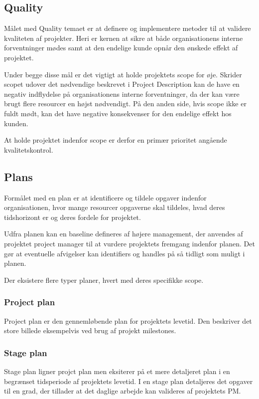 \documentclass[12pt,twoside]{article}
\begin{document}
    \subsection{Quality}
    Målet med Quality temaet er at definere og implementere metoder til at validere kvaliteten af projekter. Heri er kernen at sikre at både organisationens interne forventninger mødes samt at den endelige kunde opnår den ønskede effekt af projektet.

    Under begge disse mål er det vigtigt at holde projektets scope for øje. Skrider scopet udover det nødvendige beskrevet i Project Description kan de have en negativ indflydelse på organisationens interne forventninger, da der kan være brugt flere resourcer en højst nødvendigt. På den anden side, hvis scope ikke er fuldt mødt, kan det have negative konsekvenser for den endelige effekt hos kunden.

    At holde projektet indenfor scope er derfor en primær prioritet angående kvalitetskontrol.

    \subsection{Plans}
    \label{sec:plans}
    Formålet med en plan er at identificere og tildele opgaver indenfor organisationen, hvor mange resourcer opgaverne skal tildeles, hvad deres tidshorizont er og deres fordele for projektet.

    Udfra planen kan en baseline defineres af højere management, der anvendes af projektet project manager til at vurdere projektets fremgang indenfor planen. Det gør at eventuelle afvigelser kan identifiers og handles på så tidligt som muligt i planen.

    Der eksistere flere typer planer, hvert med deres specifikke scope.

    \subsubsection*{Project plan}
    Project plan er den gennemløbende plan for projektets levetid. Den beskriver det store billede eksempelvis ved brug af projekt milestones.

    \subsubsection*{Stage plan}
    Stage plan ligner projct plan men eksiterer på et mere detaljeret plan i en begrænset tidsperiode af projektets levetid. I en stage plan detaljeres det opgaver til en grad, der tillader at det daglige arbejde kan valideres af projektets PM.
\end{document}
